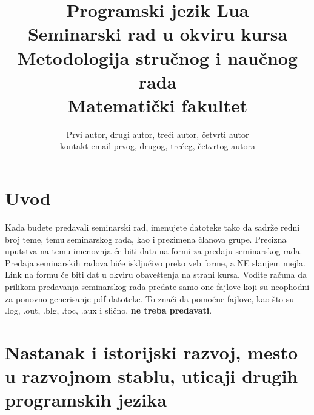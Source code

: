 \documentclass[a4paper]{article}
\begin{document}
\title{Programski jezik Lua\\ \small{Seminarski rad u okviru kursa\\Metodologija stručnog i naučnog rada\\ Matematički fakultet}}

\author{Prvi autor, drugi autor, treći autor, četvrti autor\\ kontakt email prvog, drugog, trećeg, četvrtog autora}


\maketitle


\tableofcontents

\newpage

\section{Uvod}
\label{sec:uvod}

Kada budete predavali seminarski rad, imenujete datoteke tako da sadrže redni broj teme, temu seminarskog rada, kao i prezimena članova grupe. Precizna uputstva na temu imenovnja će biti data na formi za predaju seminarskog rada. Predaja seminarskih radova biće isključivo preko veb forme, a NE slanjem mejla. Link na formu će biti dat u okviru obaveštenja na strani kursa. Vodite računa da prilikom predavanja seminarskog rada predate samo one fajlove koji su neophodni za ponovno generisanje pdf datoteke. To znači da pomoćne fajlove, kao što su .log, .out, .blg, .toc, .aux i slično, \textbf{ne treba predavati}.

\section{Nastanak i istorijski razvoj, mesto u razvojnom stablu, uticaji drugih programskih jezika}
\label{sec:istorijski_razvoj}
\end{document}
